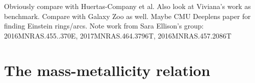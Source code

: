\documentclass[fleqn,usenatbib]{mnras}
\begin{document}
Obviously compare with Huertas-Company et al.
Also look at Viviana's work as benchmark.
Compare with Galaxy Zoo as well.
Maybe CMU Deeplens paper for finding Einstein rings/arcs.
Note work from Sara Ellison's group:
2016MNRAS.455..370E, 2017MNRAS.464.3796T, 2016MNRAS.457.2086T



%
%

\section{The mass-metallicity relation} \label{sec:MMR}
\end{document}
